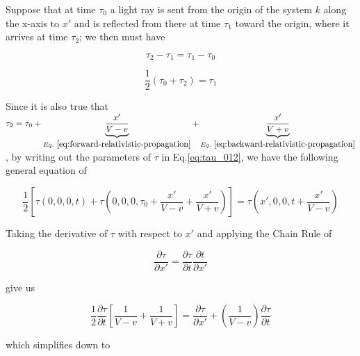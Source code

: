     Suppose that at time $\tau_0$ a light ray is sent from the origin of the system $k$ along the x-axis to $x'$ and
    is reflected from there at time $\tau_1$ toward the origin, where it arrives at time $\tau_2$; we then must have

    \[
        \tau_2 - \tau_1 = \tau_1 - \tau_0
    \]

    \begin{equation} \label{eq:tau_012}
    \frac{1}{2}(\tau_0 + \tau_2) = \tau_1
    \end{equation}

    Since it is also true that
    $\tau_2 = \tau_0 + \underbrace{\frac{x'}{V - v}}_{Eq.~\ref{eq:forward-relativistic-propagation}} + \underbrace{\frac{x'}{V + v}}_{Eq.~\ref{eq:backward-relativistic-propagation}}$,
    by writing out the parameters of $\tau$ in Eq.\ref{eq:tau_012}, we have the following general equation of

    \begin{equation}
        \frac{1}{2}\left[ \tau(0, 0, 0, t) + \tau\left( 0, 0, 0, \tau_0 + \frac{x'}{V - v} + \frac{x'}{V + v} \right) \right] = \tau\left( x', 0, 0, t + \frac{x'}{V -v} \right)
    \end{equation}

    Taking the derivative of $\tau$ with respect to $x'$ and applying the Chain Rule of

    \[
        \frac{\partial\tau}{\partial x'} = \frac{\partial\tau}{\partial t}\frac{\partial t}{\partial x'}
    \]

    give us

    \begin{equation}
        \frac{1}{2}\frac{\partial\tau}{\partial t}\left[ \frac{1}{V - v} + \frac{1}{V + v} \right] = \frac{\partial\tau}{\partial x'} + \left( \frac{1}{V - v} \right)\frac{\partial\tau}{\partial t}
    \end{equation}

    which simplifies down to


\end{tcolorbox}
